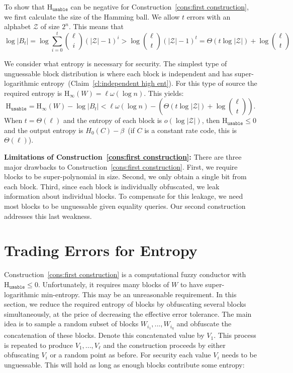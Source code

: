 \documentclass[11pt]{article}
\newcommand{\clref}[1]{\mbox{Claim~\ref{#1}}}
\newcommand{\consref}[1]{\mbox{Construction~\ref{#1}}}
\newcommand{\Hoo}{\mathrm{H}_\infty}
\newcommand{\Huse}{\mathrm{H}_{\mathtt{usable}}}
\begin{document}
To show that $\Huse$ can be negative for \consref{cons:first construction}, we first calculate the size of the Hamming ball.  We allow $t$ errors with an alphabet $\mathcal{Z}$ of size $2^n$.  This means that
\[
\log |B_t| = \log \sum_{i=0}^t {\ell \choose i} (|\mathcal{Z}|-1)^i> \log {\ell \choose t} (|\mathcal{Z}|-1)^t =\Theta(t\log |\mathcal{Z}|) + \log {\ell\choose t}
\]

We consider what entropy is necessary for security.  The simplest type of unguessable block distribution is where each block is independent and has super-logarithmic entropy~(\clref{cl:independent high ent}).  For this type of source the required entropy is $\Hoo(W) = \ell\omega(\log n)$.  This yields:
\[
\Huse = \Hoo(W) - \log |B_t| < \ell \omega(\log n) -\left( \Theta(t\log |\mathcal{Z}|) + \log {\ell \choose t}\right).
\]
When $t =\Theta(\ell)$ and the entropy of each block is $o(\log |\mathcal{Z}|)$, then $\Huse\le 0$ and the output entropy is $H_0(C) -\beta$~(if $C$ is a constant rate code, this is $\Theta(\ell)$).

\textbf{Limitations of \consref{cons:first construction}:}  There are three major drawbacks to \consref{cons:first construction}.   First, we require blocks to be super-polynomial in size.  Second, we only obtain a single bit from each block.  Third, since each block is individually obfuscated, we leak information about individual blocks.  To compensate for this leakage, we need most blocks to be unguessable given equality queries.  Our second construction addresses this last weakness.

\section{Trading Errors for Entropy}
\label{sec:sampling}
\consref{cons:first construction} is a computational fuzzy conductor with $\Huse\le 0$.  Unfortunately, it requires many blocks of $W$ to have super-logarithmic min-entropy.  This may be an unreasonable requirement.  In this section, we reduce the required entropy of blocks by obfuscating several blocks simultaneously, at the price of  decreasing the effective error tolerance.
The main idea is to sample a random subset of blocks $W_{i_1},..., W_{i_\eta}$ and obfuscate the concatenation of these blocks.  Denote this concatenated value by $V_1$.  This process is repeated to produce $V_1,..., V_\ell$ and the construction proceeds by either obfuscating $V_i$ or a random point as before. For security each value $V_i$ needs to be unguessable.  This will hold as long as enough blocks contribute some entropy:
\end{document}
